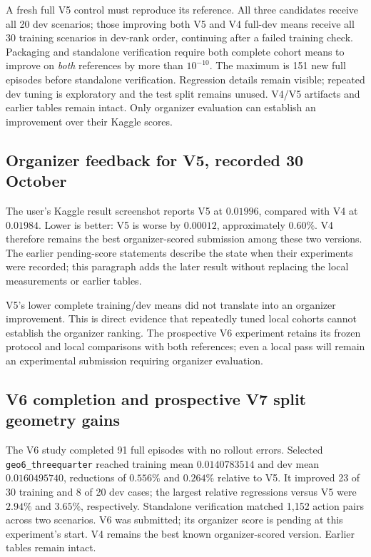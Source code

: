 A fresh full V5 control must reproduce its reference. All three candidates
receive all 20 dev scenarios; those improving both V5 and V4 full-dev means
receive all 30 training scenarios in dev-rank order, continuing after a failed
training check. Packaging and standalone verification require both complete
cohort means to improve on \emph{both} references by more than $10^{-10}$.
The maximum is 151 new full episodes before standalone verification.
Regression details remain visible; repeated dev tuning is exploratory and the
test split remains unused. V4/V5 artifacts and earlier tables remain intact.
Only organizer evaluation can establish an improvement over their Kaggle scores.



\subsection{Organizer feedback for V5, recorded 30 October}
The user's Kaggle result screenshot reports V5 at $0.01996$, compared with
V4 at $0.01984$. Lower is better: V5 is worse by $0.00012$, approximately
$0.60\%$. V4 therefore remains the best organizer-scored submission among
these two versions. The earlier pending-score statements describe the state
when their experiments were recorded; this paragraph adds the later result
without replacing the local measurements or earlier tables.

V5's lower complete training/dev means did not translate into an organizer
improvement. This is direct evidence that repeatedly tuned local cohorts
cannot establish the organizer ranking. The prospective V6 experiment retains
its frozen protocol and local comparisons with both references; even a local
pass will remain an experimental submission requiring organizer evaluation.

\subsection{V6 completion and prospective V7 split geometry gains}
The V6 study completed 91 full episodes with no rollout errors. Selected
\texttt{geo6\_threequarter} reached training mean $0.0140783514$ and dev mean
$0.0160495740$, reductions of $0.556\%$ and $0.264\%$ relative to V5.
It improved 23 of 30 training and 8 of 20 dev cases; the largest relative
regressions versus V5 were $2.94\%$ and $3.65\%$, respectively.
Standalone verification matched 1,152 action pairs across two scenarios.
V6 was submitted; its organizer score is pending at this experiment's start.
V4 remains the best known organizer-scored version. Earlier tables remain intact.

